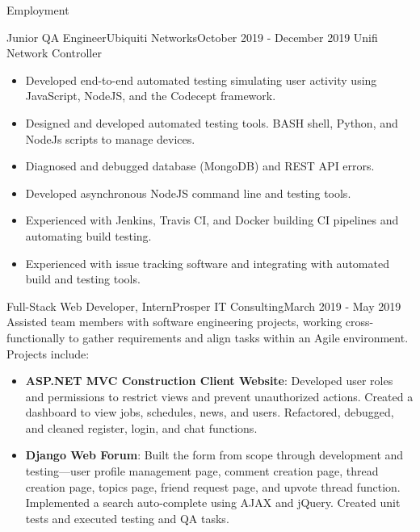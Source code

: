 \documentclass[]{mcdowellcv}
\begin{document}
	\makeheader
	
	\begin{cvsection}{Employment}
		\begin{cvsubsection}{Junior QA Engineer}{Ubiquiti Networks}{October 2019 - December 2019}
			Unifi Network Controller
			\begin{itemize}
				\item Developed end-to-end automated testing simulating user activity using JavaScript, NodeJS, and the Codecept
framework.
				\item Designed and developed automated testing tools. BASH shell, Python, and NodeJs scripts to manage devices.
				\item Diagnosed and debugged database (MongoDB) and REST API errors.
				\item Developed asynchronous NodeJS command line and testing tools.
				\item Experienced with Jenkins, Travis CI, and Docker building CI pipelines and automating build testing.
				\item Experienced with issue tracking software and integrating with automated build and testing tools.
			\end{itemize}
		\end{cvsubsection}
		
		\begin{cvsubsection}{Full-Stack Web Developer, Intern}{Prosper IT Consulting}{March 2019 - May 2019}	
			Assisted team members with software engineering projects, working cross-functionally to gather requirements and align tasks within an Agile environment. Projects include:
			\begin{itemize}
				\item \textbf{ASP.NET MVC Construction Client Website}: Developed user roles and permissions to restrict views and prevent unauthorized actions. Created a dashboard to view jobs, schedules, news, and users. Refactored, debugged, and cleaned register, login, and chat functions.
				\item \textbf{Django Web Forum}: Built the form from scope through development and testing—user profile management page, comment creation page, thread creation page, topics page, friend request page, and upvote thread function. Implemented a search auto-complete using AJAX and jQuery. Created unit tests and executed testing and QA tasks.
			\end{itemize}
		\end{cvsubsection}
		

\end{cvsection}
\end{document}
